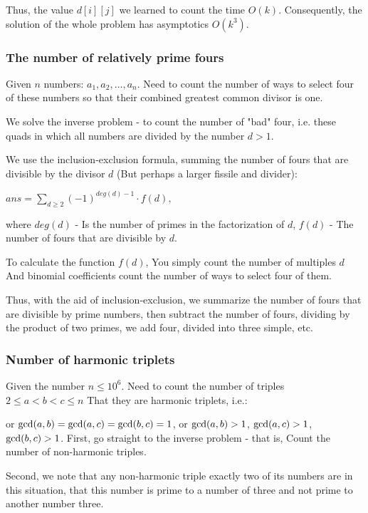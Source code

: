 Thus, the value $d [i][j]$ we learned to count the time $O (k)$. Consequently, the solution of the whole problem has asymptotics $O (k ^ 3)$.

\subsubsection{ The number of relatively prime fours }

Given $n$ numbers: $a_1, a_2, \ldots, a_n$. Need to count the number of ways to select four of these numbers so that their combined greatest common divisor is one.

We solve the inverse problem - to count the number of "bad" four, i.e. these quads in which all numbers are divided by the number $d> 1$.

We use the inclusion-exclusion formula, summing the number of fours that are divisible by the divisor $d$ (But perhaps a larger fissile and divider):

$ans = \sum_ {d \ge 2} (-1) ^ {deg (d) -1} \cdot f (d),$

where $deg (d)$ - Is the number of primes in the factorization of $d$, $f (d)$ - The number of fours that are divisible by $d$.

To calculate the function $f (d)$, You simply count the number of multiples $d$ And binomial coefficients count the number of ways to select four of them.

Thus, with the aid of inclusion-exclusion, we summarize the number of fours that are divisible by prime numbers, then subtract the number of fours, dividing by the product of two primes, we add four, divided into three simple, etc.

\subsubsection{ Number of harmonic triplets }

Given the number $n \le 10 ^ 6$. Need to count the number of triples $2 \le a <b <c \le n$ That they are harmonic triplets, i.e.:

or ${\rm gcd} (a, b) = {\rm gcd} (a, c) = {\rm gcd} (b, c) = 1$,
or ${\rm gcd} (a, b)> 1$, ${\rm gcd} (a, c)> 1$, ${\rm gcd} (b, c)> 1$.
First, go straight to the inverse problem - that is, Count the number of non-harmonic triples.

Second, we note that any non-harmonic triple exactly two of its numbers are in this situation, that this number is prime to a number of three and not prime to another number three.

